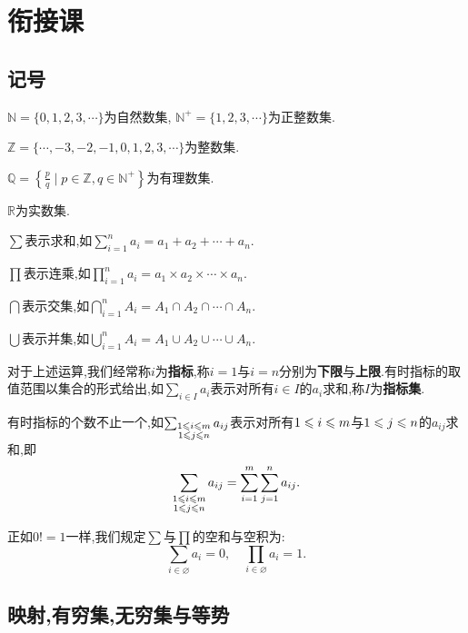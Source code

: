 \chapter{衔接课}

\section{记号}

\begin{notation*}[数集]\quad

    $\mathbb{N} = \{0,1,2,3,\cdots\}$为自然数集, $\mathbb{N}^+ = \{1,2,3,\cdots\}$为正整数集.

    $\mathbb{Z} = \{\cdots,-3,-2,-1,0,1,2,3,\cdots\}$为整数集.

    $\mathbb{Q} = \left\{ \frac{p}{q} \mid p \in \mathbb{Z}, q \in \mathbb{N}^+ \right\}$为有理数集.

    $\mathbb{R}$为实数集.
\end{notation*}

\begin{notation*}[大平行算数符号]\quad

    $\sum$表示求和,如$\sum_{i=1}^n a_i = a_1 + a_2 + \cdots + a_n$.

    $\prod$表示连乘,如$\prod_{i=1}^n a_i = a_1 \times a_2 \times \cdots \times a_n$.

    $\bigcap$表示交集,如$\bigcap_{i=1}^n A_i = A_1 \cap A_2 \cap \cdots \cap A_n$.

    $\bigcup$表示并集,如$\bigcup_{i=1}^n A_i = A_1 \cup A_2 \cup \cdots \cup A_n$.
\end{notation*}

对于上述运算,我们经常称$i$为\textbf{指标},称$i=1$与$i=n$分别为\textbf{下限}与\textbf{上限}.有时指标的取值范围以集合的形式给出,如$\sum_{i \in I} a_i$表示对所有$i \in I$的$a_i$求和,称$I$为\textbf{指标集}.

有时指标的个数不止一个,如$\sum_{\substack{1 \leqslant i \leqslant m \\ 1 \leqslant j \leqslant n}} a_{ij}$表示对所有$1 \leqslant i \leqslant m$与$1 \leqslant j \leqslant n$的$a_{ij}$求和,即
$$\sum_{\substack{1 \leqslant i \leqslant m \\ 1 \leqslant j \leqslant n}} a_{ij} = \sum_{i=1}^m \sum_{j=1}^n a_{ij}.$$

正如$0!=1$一样,我们规定$\sum$与$\prod$的空和与空积为:
$$\sum_{i \in \varnothing} a_i = 0, \quad \prod_{i \in \varnothing} a_i = 1.$$

\section{映射,有穷集,无穷集与等势}

